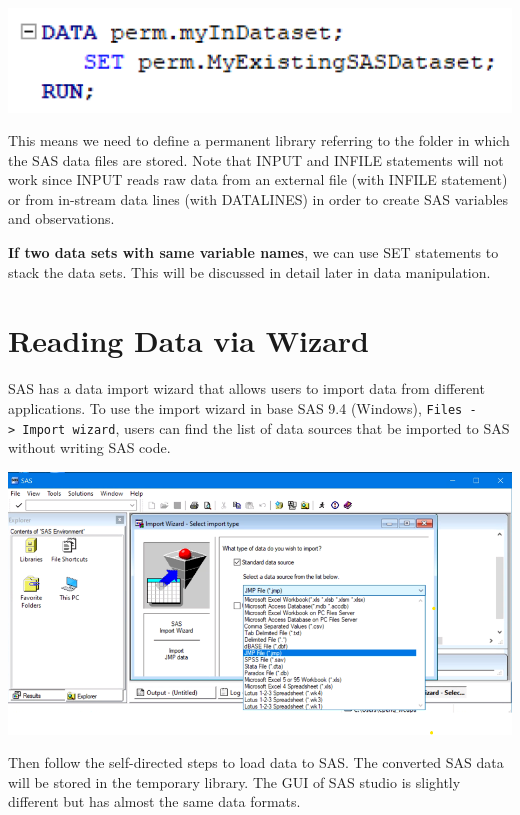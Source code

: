 \documentclass[
]{book}
\begin{document}
\begin{center}\includegraphics[width=0.7\linewidth]{img04/w04-SETstatement} \end{center}

This means we need to define a permanent library referring to the folder in which the SAS data files are stored. Note that INPUT and INFILE statements will not work since INPUT reads raw data from an external file (with INFILE statement) or from in-stream data lines (with DATALINES) in order to create SAS variables and observations.

\textbf{If two data sets with same variable names}, we can use SET statements to stack the data sets. This will be discussed in detail later in data manipulation.

\hypertarget{reading-data-via-wizard}{%
\section{Reading Data via Wizard}\label{reading-data-via-wizard}}

SAS has a data import wizard that allows users to import data from different applications. To use the import wizard in base SAS 9.4 (Windows), \texttt{Files\ -\textgreater{}\ Import\ wizard}, users can find the list of data sources that be imported to SAS without writing SAS code.

\begin{center}\includegraphics[width=1\linewidth]{img04/w04-importWizard} \end{center}

Then follow the self-directed steps to load data to SAS. The converted SAS data will be stored in the temporary library. The GUI of SAS studio is slightly different but has almost the same data formats.
\end{document}
